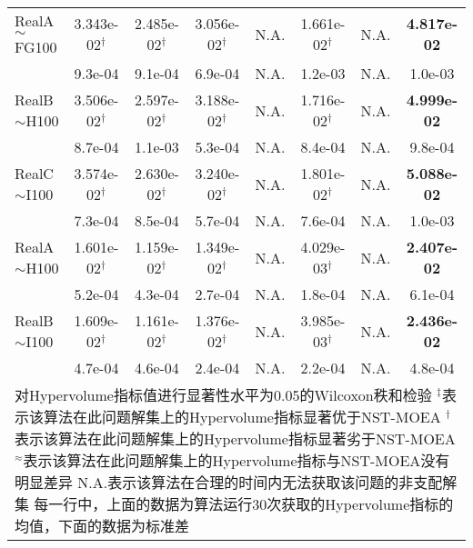 {\begin{longtable}[c]{lccccccc}
    RealA$\sim$FG100      & 3.343e-02$^{\dag}$ & 2.485e-02$^{\dag}$ & 3.056e-02$^{\dag}$ & N.A.               & 1.661e-02$^{\dag}$ & N.A.                & \textbf{4.817e-02} \\
      & 9.3e-04            & 9.1e-04            & 6.9e-04            & N.A.               & 1.2e-03            & N.A.                          & 1.0e-03            \\
    \midrule
    RealB$\sim$H100      & 3.506e-02$^{\dag}$ & 2.597e-02$^{\dag}$ & 3.188e-02$^{\dag}$ & N.A.               & 1.716e-02$^{\dag}$ & N.A.                 & \textbf{4.999e-02} \\
            & 8.7e-04            & 1.1e-03            & 5.3e-04            & N.A.               & 8.4e-04            & N.A.                           & 9.8e-04            \\
    \midrule
    RealC$\sim$I100      & 3.574e-02$^{\dag}$ & 2.630e-02$^{\dag}$ & 3.240e-02$^{\dag}$ & N.A.               & 1.801e-02$^{\dag}$ & N.A.                & \textbf{5.088e-02} \\
             & 7.3e-04            & 8.5e-04            & 5.7e-04            & N.A.               & 7.6e-04            & N.A.                           & 1.0e-03            \\
    \midrule

    RealA$\sim$H100     & 1.601e-02$^{\dag}$ & 1.159e-02$^{\dag}$ & 1.349e-02$^{\dag}$ & N.A.               & 4.029e-03$^{\dag}$ & N.A.               & \textbf{2.407e-02} \\
           & 5.2e-04            & 4.3e-04            & 2.7e-04            & N.A.               & 1.8e-04            & N.A.                          & 6.1e-04            \\
    \midrule
    RealB$\sim$I100     & 1.609e-02$^{\dag}$ & 1.161e-02$^{\dag}$ & 1.376e-02$^{\dag}$ & N.A.               & 3.985e-03$^{\dag}$ & N.A.                 & \textbf{2.436e-02} \\
           & 4.7e-04            & 4.6e-04            & 2.4e-04            & N.A.               & 2.2e-04            & N.A.                      & 4.8e-04            \\
    \bottomrule
    \multicolumn{8}{p{45em}}{
        对Hypervolume指标值进行显著性水平为0.05的Wilcoxon秩和检验\vspace{-.75em}\newline{}
        $^\ddag$表示该算法在此问题解集上的Hypervolume指标显著优于NST-MOEA\vspace{-.75em}\newline{}
        $^\dag$表示该算法在此问题解集上的Hypervolume指标显著劣于NST-MOEA\vspace{-.75em}\newline{}
        $^\approx$表示该算法在此问题解集上的Hypervolume指标与NST-MOEA没有明显差异\vspace{-.75em}\newline{}
        N.A.表示该算法在合理的时间内无法获取该问题的非支配解集\vspace{-.75em}\newline{}
        每一行中，上面的数据为算法运行30次获取的Hypervolume指标的均值，下面的数据为标准差
        }
\end{longtable}
}%
